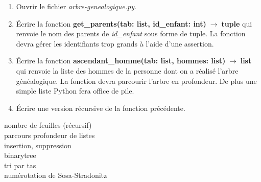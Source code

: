\documentclass[a4paper,11pt]{article}
\begin{document}
\begin{Form}
\begin{exo}
\begin{enumerate}
\item Ouvrir le fichier \emph{arbre-genealogique.py}.
\item 
\begin{center}

\label{manu}
\end{center}
Écrire la fonction \textbf{get\_parents(tab: list, id\_enfant: int)$\;\rightarrow\;$tuple} qui renvoie le nom des parents de \emph{id\_enfant} sous forme de tuple. La fonction devra gérer les identifiants trop grands à l'aide d'une assertion.
\item Écrire la fonction \textbf{ascendant\_homme(tab: list, hommes: list)$\;\rightarrow\;$list} qui renvoie la liste des hommes de la personne dont on a réalisé l'arbre généalogique. La fonction devra parcourir l'arbre en profondeur. De plus une simple liste Python fera office de pile.
\item Écrire une version récursive de la fonction précédente.
\end{enumerate}
\end{exo}
nombre de feuilles (récursif)\\
parcours profondeur de listes\\
insertion, suppression\\
binarytree\\
tri par tas\\
numérotation de Sosa-Stradonitz
\end{Form}
\end{document}

